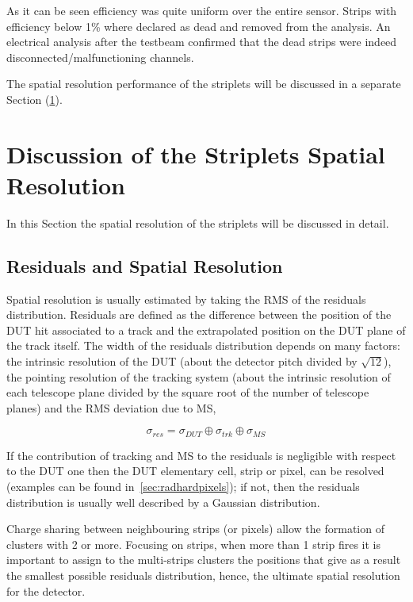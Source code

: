 As it can be seen efficiency was quite uniform
over the entire sensor. Strips with efficiency below 1\% where declared as dead and removed from the 
analysis. An electrical analysis after the testbeam confirmed that  the dead strips 
were indeed disconnected/malfunctioning channels. 

The spatial resolution performance of the striplets will be discussed in a separate Section (\ref{sec:striplets_res}).

\section{Discussion of the Striplets Spatial Resolution}
\label{sec:striplets_res}

In this Section the spatial resolution of the striplets will be discussed in detail. 

\subsection{Residuals and Spatial Resolution}

Spatial resolution is usually estimated by taking the RMS of the residuals distribution. Residuals are 
defined as the difference between the position of the DUT hit associated to a track and 
the extrapolated position on the DUT plane of the track itself. 
The width of the residuals distribution depends on many factors: the intrinsic resolution of the 
DUT (about the detector pitch divided by $\sqrt{12}$), the pointing resolution of the tracking system 
(about the intrinsic resolution of each telescope plane divided by the square root of the number of 
telescope planes) and the RMS deviation due to MS,

\begin{equation}
\sigma_{res}=\sigma_{DUT}\oplus\sigma_{trk}\oplus\sigma_{MS}
\label{eq:res}
\end{equation}

If the contribution of tracking and MS to the residuals is negligible with respect to the DUT 
one then the DUT elementary cell, strip or pixel, can be resolved (examples can be found 
in~\ref{sec:radhardpixels}); if not, then the residuals distribution 
is usually well described by a Gaussian distribution. 

Charge sharing between neighbouring strips (or pixels) allow the formation of clusters with 2 
or more. Focusing on strips, when more than 1 strip fires it is important to assign to the 
multi-strips clusters the positions that give as a result the smallest possible residuals distribution, 
hence, the ultimate spatial resolution for the detector. 


